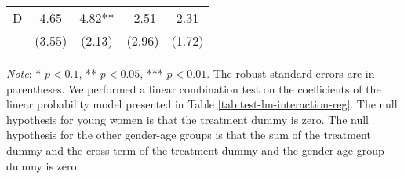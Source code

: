 \documentclass[12pt, a4paper]{article}
\begin{document}
\begin{table}[H]
\begin{threeparttable}
\begin{tabular}[t]{lcccc}
\hspace{1em}D & 4.65 & 4.82** & -2.51 & 2.31\\
\hspace{1em} & (3.55) & (2.13) & (2.96) & (1.72)\\
\bottomrule
\end{tabular}
\begin{tablenotes}
\item \emph{Note}: * $p < 0.1$, ** $p < 0.05$, *** $p < 0.01$. The robust standard errors are in parentheses. We performed a linear combination test on the coefficients of the linear probability model presented in Table \ref{tab:test-lm-interaction-reg}. The null hypothesis for young women is that the treatment dummy is zero. The null hypothesis for the other gender-age groups is that the sum of the treatment dummy and the cross term of the treatment dummy and the gender-age group dummy is zero.
\end{tablenotes}
\end{threeparttable}
\end{table}
\end{document}
